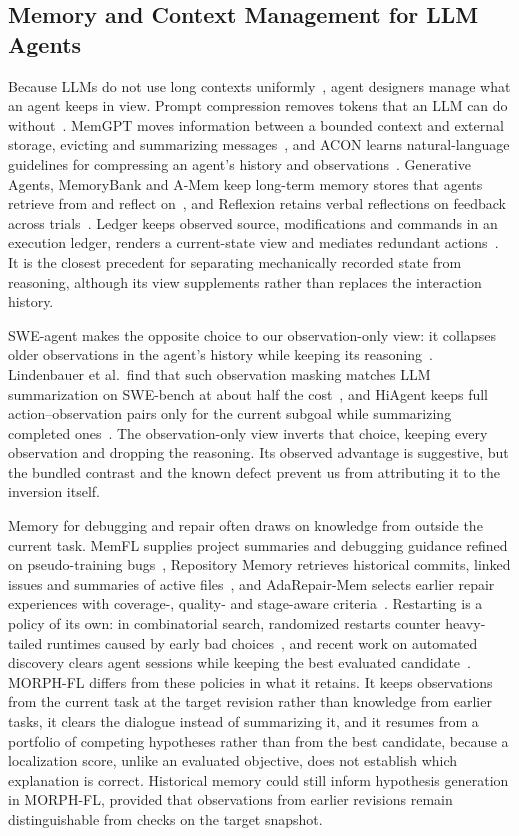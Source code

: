 \documentclass[a4paper,fleqn]{cas-sc}
\newcommand{\tool}{MORPH-FL}
\begin{document}
\subsection{Memory and Context Management for LLM Agents}
Because LLMs do not use long contexts uniformly~\citep{lostmiddle2024,contextrot2025}, agent designers manage what an agent keeps in view. Prompt compression removes tokens that an LLM can do without~\citep{llmlingua2023}. MemGPT moves information between a bounded context and external storage, evicting and summarizing messages~\citep{memgpt2024}, and ACON learns natural-language guidelines for compressing an agent's history and observations~\citep{acon2026}. Generative Agents, MemoryBank and A-Mem keep long-term memory stores that agents retrieve from and reflect on~\citep{generativeagents2023,memorybank2024,amem2025}, and Reflexion retains verbal reflections on feedback across trials~\citep{reflexion2023}. Ledger keeps observed source, modifications and commands in an execution ledger, renders a current-state view and mediates redundant actions~\citep{ledger2026}. It is the closest precedent for separating mechanically recorded state from reasoning, although its view supplements rather than replaces the interaction history.

SWE-agent makes the opposite choice to our observation-only view: it collapses older observations in the agent's history while keeping its reasoning~\citep{sweagent2024}. Lindenbauer et al.\ find that such observation masking matches LLM summarization on SWE-bench at about half the cost~\citep{complexitytrap2025}, and HiAgent keeps full action--observation pairs only for the current subgoal while summarizing completed ones~\citep{hiagent2025}. The observation-only view inverts that choice, keeping every observation and dropping the reasoning. Its observed advantage is suggestive, but the bundled contrast and the known defect prevent us from attributing it to the inversion itself.

Memory for debugging and repair often draws on knowledge from outside the current task. MemFL supplies project summaries and debugging guidance refined on pseudo-training bugs~\citep{memfl2025}, Repository Memory retrieves historical commits, linked issues and summaries of active files~\citep{repomem2026}, and AdaRepair-Mem selects earlier repair experiences with coverage-, quality- and stage-aware criteria~\citep{adarepair2026}. Restarting is a policy of its own: in combinatorial search, randomized restarts counter heavy-tailed runtimes caused by early bad choices~\citep{restarts1998}, and recent work on automated discovery clears agent sessions while keeping the best evaluated candidate~\citep{forgetting2026}. \tool{} differs from these policies in what it retains. It keeps observations from the current task at the target revision rather than knowledge from earlier tasks, it clears the dialogue instead of summarizing it, and it resumes from a portfolio of competing hypotheses rather than from the best candidate, because a localization score, unlike an evaluated objective, does not establish which explanation is correct. Historical memory could still inform hypothesis generation in \tool{}, provided that observations from earlier revisions remain distinguishable from checks on the target snapshot.
\end{document}
